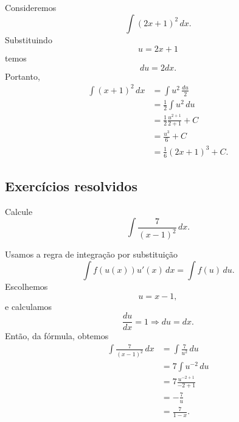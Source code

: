 \begin{ex}
  Consideremos
  \begin{equation}
    \int (2x+1)^2\,dx.
  \end{equation}
  Substituindo
  \begin{equation}
    u = 2x+1
  \end{equation}
  temos
  \begin{equation}
    du = 2dx.
  \end{equation}
  Portanto,
  \begin{align}
    \int (x+1)^2\,dx &= \int u^2\,\frac{du}{2}\\
                     &= \frac{1}{2}\int u^2\,du\\
                     &= \frac{1}{2}\frac{u^{2+1}}{2+1} + C\\
                     &= \frac{u^3}{6} + C\\
                     &= \frac{1}{6}(2x+1)^3 + C.
  \end{align}
\end{ex}

\subsection*{Exercícios resolvidos}

\begin{exeresol}
  Calcule
  \begin{equation}
    \int \frac{7}{(x-1)^2}\,dx.
  \end{equation}
\end{exeresol}
\begin{resol}
  Usamos a regra de integração por substituição
  \begin{equation}
    \int f(u(x))u'(x)\,dx = \int f(u)\,du.
  \end{equation}
  Escolhemos
  \begin{equation}
    u = x-1,
  \end{equation}
  e calculamos
  \begin{equation}
    \frac{du}{dx} = 1 \Rightarrow du = dx.
  \end{equation}
  Então, da fórmula, obtemos
  \begin{align}
    \int \frac{7}{(x-1)^2}\,dx &= \int \frac{7}{u^2}\,du\\
                               &= 7\int u^{-2}\,du\\
                               &= 7\frac{u^{-2+1}}{-2+1}\\
                               &= -\frac{7}{u}\\
                               &= \frac{7}{1-x}.
  \end{align}
\end{resol}

